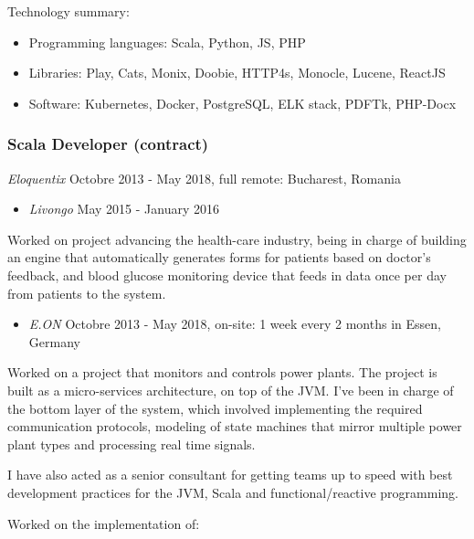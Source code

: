 \documentclass[
]{rss}
\providecommand{\tightlist}{%
  \setlength{\itemsep}{0pt}\setlength{\parskip}{0pt}}
\begin{document}
\begin{resume}
Technology summary:

\begin{itemize}
\tightlist
\item
  Programming languages: Scala, Python, JS, PHP
\item
  Libraries: Play, Cats, Monix, Doobie, HTTP4s, Monocle, Lucene, ReactJS
\item
  Software: Kubernetes, Docker, PostgreSQL, ELK stack, PDFTk, PHP-Docx
\end{itemize}

\hypertarget{scala-developer-contract}{%
\subsubsection{Scala Developer
(contract)}\label{scala-developer-contract}}

\emph{Eloquentix} Octobre 2013 - May 2018, full remote: Bucharest,
Romania

\begin{itemize}
\tightlist
\item
  \emph{Livongo} May 2015 - January 2016
\end{itemize}

Worked on project advancing the health-care industry, being in charge of
building an engine that automatically generates forms for patients based
on doctor's feedback, and blood glucose monitoring device that feeds in
data once per day from patients to the system.

\begin{itemize}
\tightlist
\item
  \emph{E.ON} Octobre 2013 - May 2018, on-site: 1 week every 2 months in
  Essen, Germany
\end{itemize}

Worked on a project that monitors and controls power plants. The project
is built as a micro-services architecture, on top of the JVM. I've been
in charge of the bottom layer of the system, which involved implementing
the required communication protocols, modeling of state machines that
mirror multiple power plant types and processing real time signals.

I have also acted as a senior consultant for getting teams up to speed
with best development practices for the JVM, Scala and
functional/reactive programming.

Worked on the implementation of:


\end{resume}
\end{document}
